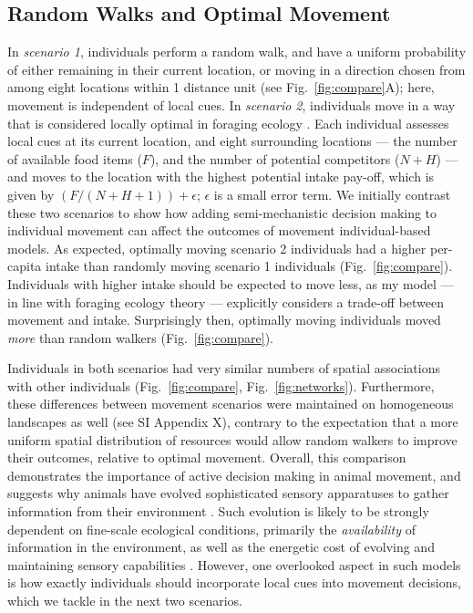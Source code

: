 \subsection*{Random Walks and Optimal Movement}

In \textit{scenario 1}, individuals perform a random walk, and have a uniform probability of either remaining in their current location, or moving in a direction chosen from among eight locations within 1 distance unit (see Fig.~\ref{fig:compare}A); here, movement is independent of local cues.
In \textit{scenario 2}, individuals move in a way that is considered locally optimal in foraging ecology \citep{stephens2019,scherer2020}.
Each individual assesses local cues at its current location, and eight surrounding locations --- the number of available food items ($F$), and the number of potential competitors ($N + H$) --- and moves to the location with the highest potential intake pay-off, which is given by $(F / (N + H + 1)) + \epsilon$; $\epsilon$ is a small error term.
We initially contrast these two scenarios to show how adding semi-mechanistic decision making to individual movement can affect the outcomes of movement individual-based models.
As expected, optimally moving scenario 2 individuals had a higher per-capita intake than randomly moving scenario 1 individuals (Fig.~\ref{fig:compare}).
Individuals with higher intake should be expected to move less, as my model --- in line with foraging ecology theory \citep{charnov1976} --- explicitly considers a trade-off between movement and intake.
Surprisingly then, optimally moving individuals moved \textit{more} than random walkers (Fig.~\ref{fig:compare}).

Individuals in both scenarios had very similar numbers of spatial associations with other individuals (Fig.~\ref{fig:compare}, Fig.~\ref{fig:networks}).
Furthermore, these differences between movement scenarios were maintained on homogeneous landscapes as well (see SI Appendix X), contrary to the expectation that a more uniform spatial distribution of resources would allow random walkers to improve their outcomes, relative to optimal movement.
Overall, this comparison demonstrates the importance of active decision making in animal movement, and suggests why animals have evolved sophisticated sensory apparatuses to gather information from their environment \citep{avgar2013,berger2022,mann2021,swain2021}.
Such evolution is likely to be strongly dependent on fine-scale ecological conditions, primarily the \textit{availability} of information in the environment, as well as the energetic cost of evolving and maintaining sensory capabilities \citep{swain2021}.
However, one overlooked aspect in such models is how exactly individuals should incorporate local cues into movement decisions, which we tackle in the next two scenarios.


